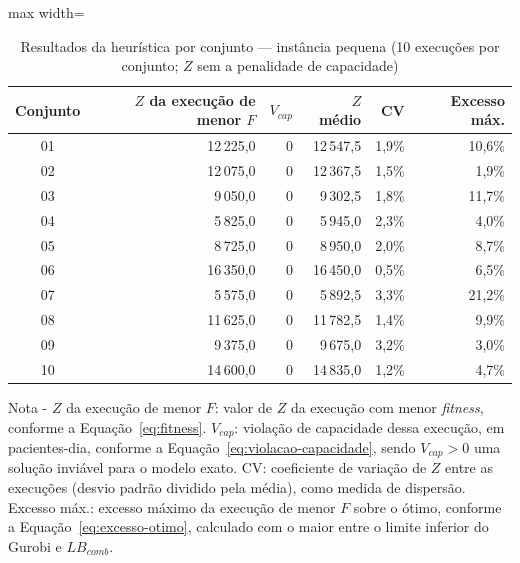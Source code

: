 \begin{table}[htbp]
    \caption[Resultados da heurística por conjunto --- instância pequena]{Resultados da heurística por conjunto --- instância pequena (10 execuções por conjunto; $Z$ sem a penalidade de capacidade)}
    \label{tab:res-z-pequeno}
    \centering
    \begin{adjustbox}{max width=\textwidth}
    \begin{tabular}{crrrrr}
        \hline
        \textbf{Conjunto} & \textbf{$Z$ da execução de menor $F$} & \textbf{$V_{cap}$} & \textbf{$Z$ médio} & \textbf{CV} & \textbf{Excesso máx.} \\
        \hline
        01 & 12\,225,0 & 0 & 12\,547,5 & 1,9\% & 10,6\% \\
        02 & 12\,075,0 & 0 & 12\,367,5 & 1,5\% & 1,9\% \\
        03 & 9\,050,0 & 0 & 9\,302,5 & 1,8\% & 11,7\% \\
        04 & 5\,825,0 & 0 & 5\,945,0 & 2,3\% & 4,0\% \\
        05 & 8\,725,0 & 0 & 8\,950,0 & 2,0\% & 8,7\% \\
        06 & 16\,350,0 & 0 & 16\,450,0 & 0,5\% & 6,5\% \\
        07 & 5\,575,0 & 0 & 5\,892,5 & 3,3\% & 21,2\% \\
        08 & 11\,625,0 & 0 & 11\,782,5 & 1,4\% & 9,9\% \\
        09 & 9\,375,0 & 0 & 9\,675,0 & 3,2\% & 3,0\% \\
        10 & 14\,600,0 & 0 & 14\,835,0 & 1,2\% & 4,7\% \\
        \hline
    \end{tabular}
    \end{adjustbox}
    \par\smallskip
    {\footnotesize Nota - $Z$ da execução de menor $F$: valor de $Z$ da execução com menor \textit{fitness}, conforme a Equação~\eqref{eq:fitness}. $V_{cap}$: violação de capacidade dessa execução, em pacientes-dia, conforme a Equação~\eqref{eq:violacao-capacidade}, sendo $V_{cap} > 0$ uma solução inviável para o modelo exato. CV: coeficiente de variação de $Z$ entre as execuções (desvio padrão dividido pela média), como medida de dispersão. Excesso máx.: excesso máximo da execução de menor $F$ sobre o ótimo, conforme a Equação~\eqref{eq:excesso-otimo}, calculado com o maior entre o limite inferior do Gurobi e $LB_{comb}$.}
\end{table}
